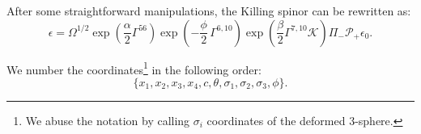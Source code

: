 After some straightforward manipulations, the Killing spinor can be rewritten as:
\begin{equation}\label{eq:KillingSpinor}
\boxed{ \epsilon =  \Omega^{1/2} \exp{\left(\frac{\alpha}{2}\Gamma^{56} \right)} \exp{\left(-\frac{\phi}{2}\, \Gamma^{6,10} \right)} \exp{\left(\frac{\beta}{2}\Gamma^{7, 10} \mathcal{K} \right)} \Pi_{-} \mathcal{P}_+ \epsilon_0}.
\end{equation}

We number the coordinates\footnote{We abuse the notation by calling $\sigma_i$ coordinates of the deformed 3-sphere.} in the following order:
\begin{equation}
 \{x_1, x_2, x_3, x_4, c, \theta, \sigma_1, \sigma_2, \sigma_3, \phi\}. 
\end{equation}


